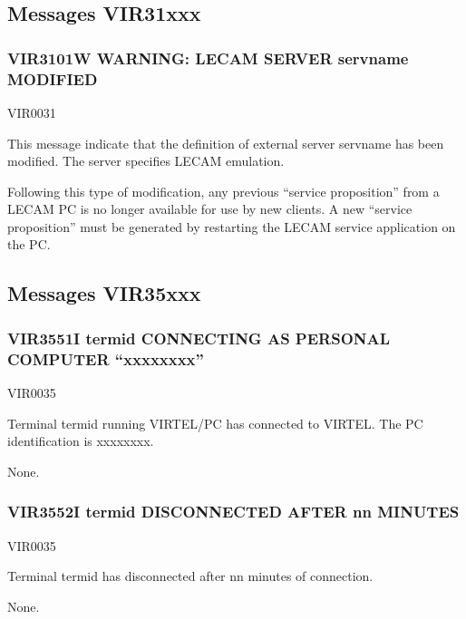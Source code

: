 \documentclass[letterpaper,10pt,english]{sphinxmanual}
\begin{document}
\subsection{Messages VIR31xxx}
\label{\detokenize{messages:messages-vir31xxx}}

\subsubsection{VIR3101W WARNING: LECAM SERVER servname MODIFIED}
\label{\detokenize{messages:vir3101w-warning-lecam-server-servname-modified}}\begin{description}
\sphinxAtStartPar
VIR0031

\sphinxAtStartPar
This message indicate that the definition of external server servname has been modified. The server specifies LECAM emulation.

\sphinxAtStartPar
Following this type of modification, any previous “service proposition” from a LECAM PC is no longer available for use by new clients. A new “service proposition” must be generated by restarting the LECAM service application on the PC.

\end{description}


\subsection{Messages VIR35xxx}
\label{\detokenize{messages:messages-vir35xxx}}

\subsubsection{VIR3551I termid CONNECTING AS PERSONAL COMPUTER “xxxxxxxx”}
\label{\detokenize{messages:vir3551i-termid-connecting-as-personal-computer-xxxxxxxx}}\begin{description}
\sphinxAtStartPar
VIR0035

\sphinxAtStartPar
Terminal termid running VIRTEL/PC has connected to VIRTEL. The PC identification is xxxxxxxx.

\sphinxAtStartPar
None.

\end{description}


\subsubsection{VIR3552I termid DISCONNECTED AFTER nn MINUTES}
\label{\detokenize{messages:vir3552i-termid-disconnected-after-nn-minutes}}\begin{description}
\sphinxAtStartPar
VIR0035

\sphinxAtStartPar
Terminal termid has disconnected after nn minutes of connection.

\sphinxAtStartPar
None.

\end{description}
\end{document}

